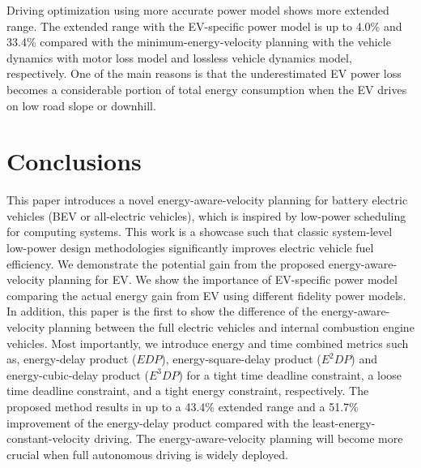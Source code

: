 \documentclass{IEEEtran}
\begin{document}
Driving optimization using more accurate power model shows more extended range. The extended range with the EV-specific power model is up to 4.0\% and 33.4\% compared with the minimum-energy-velocity planning with the vehicle dynamics with motor loss model and lossless vehicle dynamics model, respectively. One of the main reasons is that the underestimated EV power loss becomes a considerable portion of total energy consumption when the EV drives on low road slope or downhill.

\section{Conclusions} \label{sec:conclusions}

This paper introduces a novel energy-aware-velocity planning for battery electric vehicles (BEV or all-electric vehicles), which is inspired by low-power scheduling for computing systems. This work is a showcase such that classic system-level  low-power design methodologies significantly improves electric vehicle fuel efficiency. We demonstrate the potential gain from the proposed energy-aware-velocity planning for EV. We show the importance of EV-specific power model  comparing the actual energy gain from EV using different fidelity power models. In addition, this paper is the first to show the difference of the energy-aware-velocity planning between the full electric vehicles and internal combustion engine vehicles. Most importantly, we introduce energy and time combined metrics such as, energy-delay product ($EDP$), energy-square-delay product ($E^2DP$) and energy-cubic-delay product ($E^3DP$) for a tight time deadline constraint, a loose time deadline constraint, and a tight energy constraint, respectively. 
The proposed method results in up to a 43.4\% extended range and a  51.7\% improvement of the energy-delay product compared with the least-energy-constant-velocity driving. 
The energy-aware-velocity planning will become more crucial when full autonomous driving is widely deployed.





\end{document}

